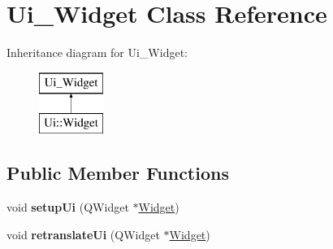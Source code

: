 \hypertarget{classUi__Widget}{\section{Ui\-\_\-\-Widget Class Reference}
\label{classUi__Widget}
}
Inheritance diagram for Ui\-\_\-\-Widget\-:\begin{figure}[H]
\begin{center}
\leavevmode
\includegraphics[height=2.000000cm]{classUi__Widget}
\end{center}
\end{figure}
\subsection*{Public Member Functions}
\begin{DoxyCompactItemize}
\item 
\hypertarget{classUi__Widget_a9039ed8704971418cbe19ef8c9eea266}{void {\bfseries setup\-Ui} (Q\-Widget $\ast$\hyperlink{classWidget}{Widget})}\label{classUi__Widget_a9039ed8704971418cbe19ef8c9eea266}

\item 
\hypertarget{classUi__Widget_ae1cb85db8d3658df8dcd104361edcecb}{void {\bfseries retranslate\-Ui} (Q\-Widget $\ast$\hyperlink{classWidget}{Widget})}\label{classUi__Widget_ae1cb85db8d3658df8dcd104361edcecb}

\end{DoxyCompactItemize}
